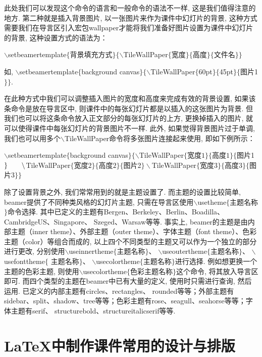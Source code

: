 此处我们可以发现这个命令的语言和一般命令的语法不一样, 这是我们值得注意的地方.
第二种就是插入背景图片, 以一张图片来作为课件中幻灯片的背景, 这种方式需要我们在导言区引入宏包wallpaper才能将我们准备好图片设置为课件中幻灯片的背景, 这种设置方式的语法为：\\
\centerline{
$\backslash$setbeamertemplate$\{$背景填充方式$\}\{\backslash$TileWallPaper$\{$宽度$\}\{$高度$\}\{$文件名$\}\}$}
如, $\backslash$setbeamertemplate$\{$background canvas$\}\{\backslash$TileWallPaper$\{$60pt$\}\{$45pt$\}\{$图片1$\}\}$.


在此种方式中我们可以调整插入图片的宽度和高度来完成有效的背景设置, 如果该条命令是放在导言区中, 则课件中的每张幻灯片都是以插入的这张图片为背景. 但我们也可以将这条命令放入正文部分的每张幻灯片的上方, 更换掉插入的图片, 就可以使得课件中每张幻灯片的背景图片不一样. 此外, 如果觉得背景图片过于单调, 我们也可以用多个$\backslash$TileWallPaper命令将多张图片连接起来使用, 即如下例所示：

\noindent$\backslash$setbeamertemplate$\{$background canvas$\}\{\backslash$TileWallPaper$\{$宽度$1\}\{$高度$1\}\{$图片1$\}\\ \qquad \backslash$TileWallPaper$\{$宽度$2\}\{$高度$2\}\{$图片2$\} \backslash$TileWallPaper$\{$宽度$3\}\{$高度$3\}\{$图片3$\}\}$


除了设置背景之外, 我们常常用到的就是主题设置了. 而主题的设置比较简单, beamer提供了不同种类风格的幻灯片主题, 只需在导言区使用$\backslash$usetheme$\{$主题名称$\}$命令选择. 其中已定义的主题有Bergen、Berkeley、Berlin、Boadilla、CambridgeUS、Singapore、
Szeged、Warsaw等等. 事实上, beamer的主题是由内部主题（inner theme）、外部主题（outer theme）、字体主题（font theme）、色彩主题（color）等组合而成的, 以上四个不同类型的主题又可以作为一个独立的部分进行更改, 分别使用$\backslash$useinnertheme$\{$主题名称$\}$、 $\backslash$useoutertheme$\{$主题名称$\}$、 $\backslash$usefonttheme$\{$ 主题名称$\}$、 $\backslash$usecolortheme$\{$主题名称$\}$进行选择. 例如想更换一个主题的色彩主题, 则使用$\backslash$usecolortheme$\{$色彩主题名称$\}$这个命令, 将其放入导言区即可. 而四个类型的主题在beamer中已有大量的定义, 使用时只需进行查询, 然后运用. 已定义的内部主题有circles、rectangles、
rounded等等；外部主题有sidebar、split、shadow、tree等等；色彩主题有rose、seagull、seahorse等等；字体主题有serif、
structurebold、structureitalicserif等等.


\section{\LaTeX{}中制作课件常用的设计与排版}

